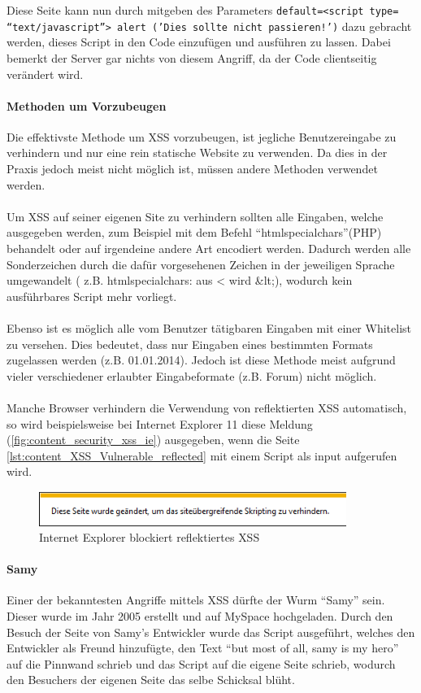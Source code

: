 Diese Seite kann nun durch mitgeben des Parameters  \texttt{default=<script type=\\\enquote{text/javascript}> alert ('Dies sollte nicht passieren!')} dazu gebracht werden, dieses Script in den Code einzufügen und ausführen zu lassen. Dabei bemerkt der Server gar nichts von diesem Angriff, da der Code clientseitig verändert wird. 

\paragraph{Methoden um Vorzubeugen}

\label{sec:content_security_cross_site_scripting_Methods}
Die effektivste Methode um XSS vorzubeugen, ist jegliche Benutzereingabe zu verhindern und nur eine rein statische Website zu verwenden. Da dies in der Praxis jedoch meist nicht möglich ist, müssen andere Methoden verwendet werden.\\\\ 
Um XSS auf seiner eigenen Site zu verhindern sollten alle Eingaben, welche ausgegeben werden, zum Beispiel mit dem Befehl \enquote{htmlspecialchars}(PHP) behandelt oder auf irgendeine andere Art encodiert werden. Dadurch werden alle Sonderzeichen durch die dafür vorgesehenen Zeichen in der jeweiligen Sprache umgewandelt ( z.B. htmlspecialchars: aus < wird \&lt;), wodurch kein ausführbares Script mehr vorliegt.\\\\
Ebenso ist es möglich alle vom Benutzer tätigbaren Eingaben mit einer Whitelist zu versehen. Dies bedeutet, dass nur Eingaben eines bestimmten Formats zugelassen werden (z.B. 01.01.2014). Jedoch ist diese Methode meist aufgrund vieler verschiedener erlaubter Eingabeformate (z.B. Forum) nicht möglich.\\\\
Manche Browser verhindern die Verwendung von reflektierten XSS automatisch, so wird beispielsweise bei Internet Explorer 11 diese Meldung (\autoref{fig:content_security_xss_ie}) ausgegeben, wenn die Seite \autoref{lst:content_XSS_Vulnerable_reflected} mit einem Script als input aufgerufen wird.

\begin{figure}[H]
\centering
\includegraphics[keepaspectratio=true, width=10cm]{images/screenshots/xss_ie.png}
\caption{Internet Explorer blockiert reflektiertes XSS}
\label{fig:content_security_xss_ie}
\end{figure}

\paragraph{Samy}
Einer der bekanntesten Angriffe mittels XSS dürfte der Wurm \enquote{Samy} sein. Dieser wurde im Jahr 2005 erstellt und auf MySpace hochgeladen. Durch den Besuch der Seite von Samy's Entwickler wurde das Script ausgeführt, welches den Entwickler als Freund hinzufügte, den Text \enquote{but most of all, samy is my hero} auf die Pinnwand schrieb und das Script auf die eigene Seite schrieb, wodurch den Besuchers der eigenen Seite das selbe Schicksal blüht.
